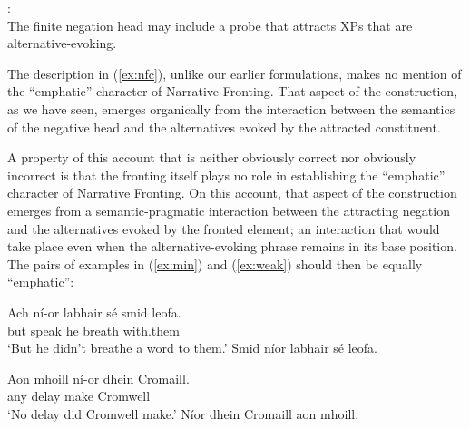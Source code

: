 \documentclass[output=paper,colorlinks,citecolor=brown]{langscibook}
\begin{document}
:\label{ex:nfc} \\
The finite negation head may include a probe that attracts XPs that are alternative-evoking.
\z


The description in (\ref{ex:nfc}), unlike our earlier formulations, makes no mention of the “emphatic” character of Narrative Fronting. That aspect of the construction, as we have seen, emerges organically from the interaction between the semantics of the negative head and the alternatives evoked by the attracted constituent.

A property of this account that is neither obviously correct nor obviously incorrect is that the fronting itself plays no role in establishing the “emphatic” character of Narrative Fronting. On this account, that aspect of the construction emerges from a semantic-pragmatic interaction between the attracting negation and the alternatives evoked by the fronted element; an interaction that would take place even when the alternative-evoking phrase remains in its base position. The pairs of examples in (\ref{ex:min}) and (\ref{ex:weak}) should then be equally “emphatic”:

\ea\label{ex:min}
\ea
\gll Ach ní-or labhair sé smid leofa. \\
     but {\nior} {speak\past} he breath with.them \\
\glt `But he didn't breathe a word to them.'
\ex Smid níor labhair sé {\gapline} leofa.
\z
\z


\ea\label{ex:weak}
\ea
\gll Aon mhoill ní-or dhein Cromaill. {\gapline} \\
     any delay {\nior} {make\past} Cromwell {} \\
\glt `No delay did Cromwell make.'
\ex Níor dhein Cromaill aon mhoill.
\z
\z

\end{document}
